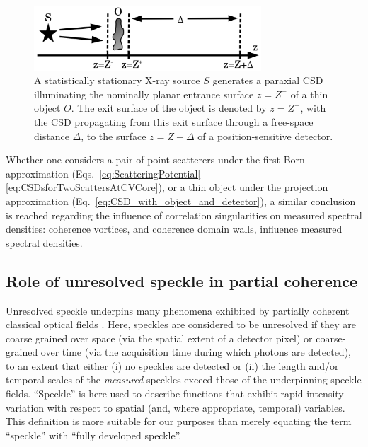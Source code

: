 \documentclass[%
 reprint,
 amsmath,amssymb,
 aps,
]{revtex4-1}
\begin{document}
\begin{figure}
\includegraphics[width=8.5cm]{Figures/ImagingWithCoherenceVortex.png}
\caption{A statistically stationary X-ray source $S$ generates a paraxial CSD illuminating the nominally planar entrance surface $z=Z^-$ of a thin object $O$.  The exit surface of the object is denoted by $z=Z^+$, with the CSD propagating from this exit surface through a free-space distance $\Delta$, to the surface $z=Z+\Delta$ of a position-sensitive detector.}
\label{fig:ImagingWithCoherenceVortex}
\end{figure}

Whether one considers a pair of point scatterers under the first Born approximation (Eqs.~\ref{eq:ScatteringPotential}-\ref{eq:CSDsforTwoScattersAtCVCore}), or a thin object under the projection approximation (Eq.~\ref{eq:CSD_with_object_and_detector}), a similar conclusion is reached regarding the influence of correlation singularities on measured spectral densities: coherence vortices, and coherence domain walls, influence measured spectral densities.  

\subsection{Role of unresolved speckle in partial coherence}\label{subsec:Discussion-part-2}

Unresolved speckle underpins many phenomena exhibited by partially coherent classical optical fields \cite{Nugent2003,paganin_book,Nesterets2008}.  Here, speckles are considered to be unresolved if they are coarse grained over space (via the spatial extent of a detector pixel) or coarse-grained over time (via the acquisition time during which photons are detected), to an extent that either (i) no speckles are detected or (ii) the length and/or temporal scales of the {\em measured} speckles exceed those of the underpinning speckle fields.  ``Speckle'' is here used to describe functions that exhibit rapid intensity variation with respect to spatial (and, where appropriate, temporal) variables. This definition is more suitable for our purposes than merely equating the term ``speckle'' with ``fully developed speckle''. 
\end{document}
